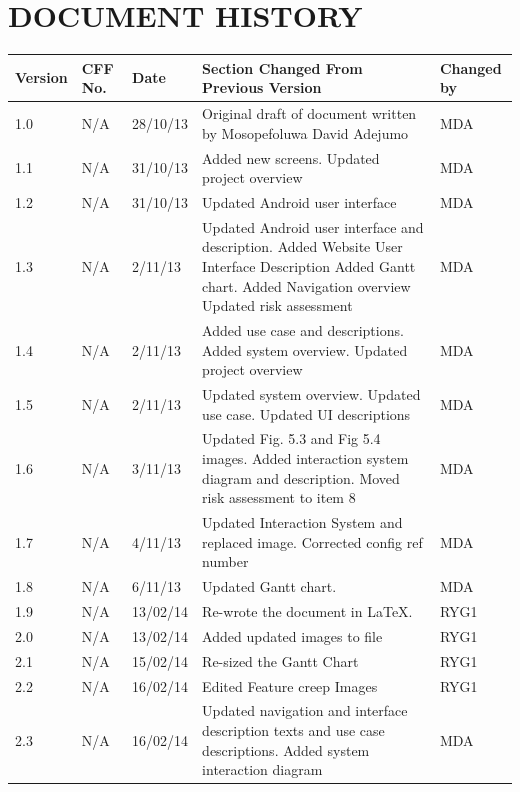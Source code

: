 \documentclass[12pt]{article}
\begin{document}
\section{DOCUMENT HISTORY}
\begin{longtable}{|p{1.5cm}|p{1.5cm}|p{2cm}|p{6cm}| p{2cm}|}
\hline
	Version & CFF No. & Date & Section Changed From Previous Version & Changed by \\
\hline
	1.0 & N/A & 28/10/13 & Original draft of document written by Mosopefoluwa David Adejumo & MDA \\ 
\hline
	1.1 & N/A & 31/10/13 & Added new screens. Updated project overview &MDA \\
\hline
	1.2 & N/A & 31/10/13 & Updated Android user interface & MDA \\
\hline 
	1.3 & N/A & 2/11/13 & Updated Android user interface and description.
Added Website User Interface Description
Added Gantt chart. Added Navigation overview
Updated risk assessment & MDA \\
\hline 
	1.4 & N/A & 2/11/13 & Added use case and descriptions. Added system overview. Updated project overview & MDA \\
\hline 
	1.5 & N/A & 2/11/13 & Updated system overview. Updated use case. Updated UI descriptions & MDA \\
\hline
	1.6 & N/A & 3/11/13 & Updated Fig. 5.3 and Fig 5.4 images. Added interaction system diagram and description.
Moved risk assessment to item 8 & MDA \\
\hline 
	1.7 & N/A & 4/11/13 & Updated Interaction System and replaced image. Corrected config ref number & MDA \\
\hline 
	1.8 & N/A & 6/11/13 & Updated Gantt chart. & MDA \\
\hline	
	1.9 & N/A & 13/02/14 & Re-wrote the document in LaTeX. & RYG1 \\
\hline
	2.0 & N/A & 13/02/14 & Added updated images to file & RYG1 \\
\hline
	2.1	& N/A & 15/02/14 & Re-sized the Gantt Chart & RYG1 \\
\hline
	2.2	& N/A & 16/02/14 & Edited Feature creep Images & RYG1 \\
\hline
	2.3	& N/A & 16/02/14 & Updated navigation and interface description texts and use case descriptions. Added system interaction diagram & MDA \\
\hline
\end{longtable}
\end{document}
